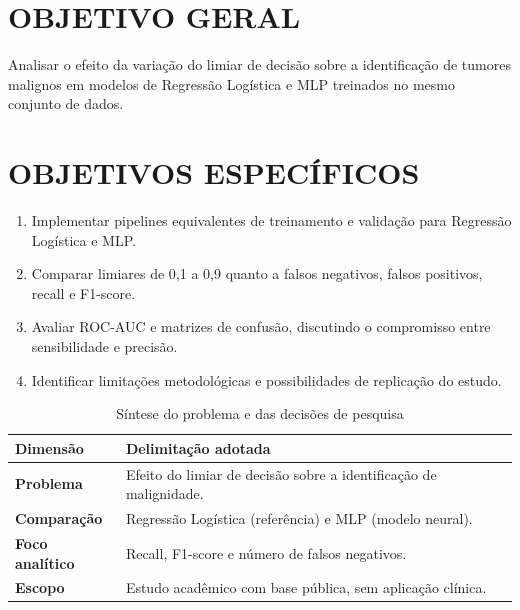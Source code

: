 \documentclass[article,11pt,oneside,a4paper,english,brazil,sumario=tradicional]{abntex2}
\begin{document}
\section{OBJETIVO GERAL}
Analisar o efeito da variação do limiar de decisão sobre a identificação de tumores malignos em modelos de Regressão Logística e MLP treinados no mesmo conjunto de dados.

\section{OBJETIVOS ESPECÍFICOS}
\begin{enumerate}[leftmargin=*,itemsep=2pt,topsep=3pt]
\item Implementar pipelines equivalentes de treinamento e validação para Regressão Logística e MLP.
\item Comparar limiares de 0,1 a 0,9 quanto a falsos negativos, falsos positivos, recall e F1-score.
\item Avaliar ROC-AUC e matrizes de confusão, discutindo o compromisso entre sensibilidade e precisão.
\item Identificar limitações metodológicas e possibilidades de replicação do estudo.
\end{enumerate}

\begin{table}[!ht]
\centering
\caption{Síntese do problema e das decisões de pesquisa}
\small
\begin{tabularx}{\textwidth}{@{}>{\bfseries}p{3.4cm}X@{}}
\toprule
Dimensão & Delimitação adotada \\
\midrule
Problema & Efeito do limiar de decisão sobre a identificação de malignidade. \\
Comparação & Regressão Logística (referência) e MLP (modelo neural). \\
Foco analítico & Recall, F1-score e número de falsos negativos. \\
Escopo & Estudo acadêmico com base pública, sem aplicação clínica. \\
\bottomrule
\end{tabularx}
\par\vspace{2mm}{\footnotesize Fonte: elaboração própria (2026).}
\end{table}
\end{document}
